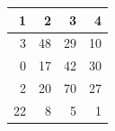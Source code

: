 \begin{tabular}{rrrr}
\toprule
1 & 2 & 3 & 4 \\
\midrule
3 & 48 & 29 & 10 \\
0 & 17 & 42 & 30 \\
2 & 20 & 70 & 27 \\
22 & 8 & 5 & 1 \\
\bottomrule
\end{tabular}
